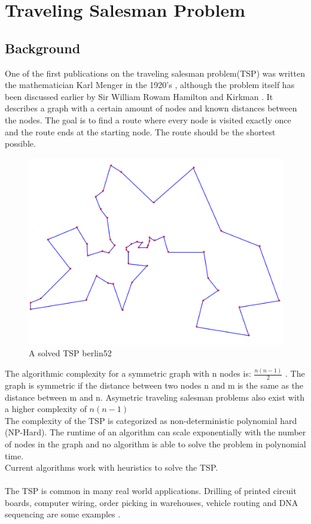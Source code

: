 \chapter{Traveling Salesman Problem}
\label{chap:tsp}
\section{Background}
One of the first publications on the traveling salesman problem(TSP) was written the mathematician Karl Menger in the 1920's \cite{Applegate}, although the problem itself has been discussed earlier by Sir William Rowam Hamilton and Kirkman \cite{Matai10}. It describes a graph with a certain amount of nodes and known distances between the nodes. The goal is to find a route where every node is visited exactly once and the route ends at the starting node. The route should be the shortest possible.
\begin{figure}[H]
	\includegraphics[]{Images/berlin52.png}
	\caption{A solved TSP berlin52}
	\label{berlin52}
\end{figure}
\newpage
The algorithmic complexity for a symmetric graph with n nodes is: $\frac{n(n-1)}{2}$ \cite{Applegate}.
The graph is symmetric if the distance between two nodes n and m is the same as the distance between m and n. Asymetric traveling salesman problems also exist with a higher complexity of $n(n-1)$\\
The complexity of the TSP is categorized as non-deterministic polynomial hard (NP-Hard). The runtime of an algorithm can scale exponentially with the number of nodes in the graph and no algorithm is able to solve the problem in polynomial time.\\
Current algorithms work with heuristics to solve the TSP.\\\\
The TSP is common in many real world applications. Drilling of printed circuit boards, computer wiring, order picking in warehouses, vehicle routing and DNA sequencing are some examples \cite{Matai10}.
